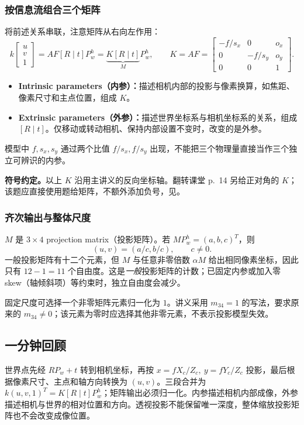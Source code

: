 
\subsubsection*{按信息流组合三个矩阵}

将前述关系串联，注意矩阵从右向左作用：
\[
  k\begin{bmatrix}u\\v\\1\end{bmatrix}
   =AF[R\mid t]P_w^h
   =\underbrace{K[R\mid t]}_{M}P_w^h,
  \qquad
  K=AF=\begin{bmatrix}-f/s_x&0&o_x\\0&-f/s_y&o_y\\0&0&1\end{bmatrix}.
\]
\begin{itemize}
  \item \textbf{Intrinsic parameters（内参）：}描述相机内部的投影与像素换算，如焦距、像素尺寸和主点位置，组成 $K$。
  \item \textbf{Extrinsic parameters（外参）：}描述世界坐标系与相机坐标系的关系，组成 $[R\mid t]$。仅移动或转动相机、保持内部设置不变时，改变的是外参。
\end{itemize}
模型中 $f,s_x,s_y$ 通过两个比值 $f/s_x,f/s_y$ 出现，不能把三个物理量直接当作三个独立可辨识的内参。

\textbf{符号约定。}以上 $K$ 沿用主讲义的反向坐标轴。翻转课堂 p.~14 另给正对角的 $K$；该题应直接使用题给矩阵，不额外添加负号，见。

\subsubsection*{齐次输出与整体尺度}

$M$ 是 $3\times4$ projection matrix（投影矩阵）。若
$MP_w^h=(a,b,c)^T$，则
\[
  \boxed{(u,v)=(a/c,b/c)},\qquad c\ne0.
\]
一般投影矩阵有十二个元素，但 $M$ 与任意非零倍数 $\alpha M$ 给出相同像素坐标，因此只有 $12-1=11$ 个自由度。这是\emph{一般}投影矩阵的计数；已固定内参或加入零 skew（轴倾斜项）等约束时，独立自由度会减少。

固定尺度可选择一个非零矩阵元素归一化为 $1$。讲义采用 $m_{34}=1$ 的写法，要求原来的 $m_{34}\ne0$；该元素为零时应选择其他非零元素，不表示投影模型失效。

\subsection{一分钟回顾}

世界点先经 $RP_w+t$ 转到相机坐标，再按 $x=fX_c/Z_c,\ y=fY_c/Z_c$ 投影，最后根据像素尺寸、主点和轴方向转换为 $(u,v)$。三段合并为 $k(u,v,1)^T=K[R\mid t]P_w^h$；矩阵输出必须归一化。内参描述相机内部成像，外参描述相机与世界的相对位置和方向。透视投影不能保留唯一深度，整体缩放投影矩阵也不会改变成像位置。
